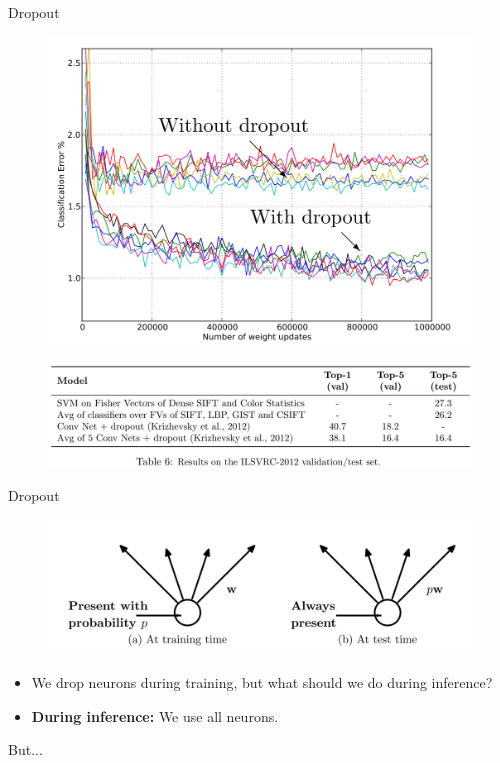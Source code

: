 \begin{frame}{Dropout}
    \begin{figure}
    \centering
    \includegraphics[width=1.0\textwidth,height=0.5\textheight,keepaspectratio]{images/dropout_3.png}
    \end{figure}
    \begin{figure}
    \centering
    \includegraphics[width=1.0\textwidth,height=0.5\textheight,keepaspectratio]{images/dropout_4.png}
    \end{figure}
\end{frame}

\begin{frame}{Dropout}
\begin{figure}
    \centering
    \includegraphics[width=1.0\textwidth,height=0.8\textheight,keepaspectratio]{images/dropout_2.png}
\end{figure}
\begin{itemize}
    \item We drop neurons during training, but what should we do during inference?
    \item \textbf{During inference:} We use all neurons. 
\end{itemize}
But...
\end{frame}

